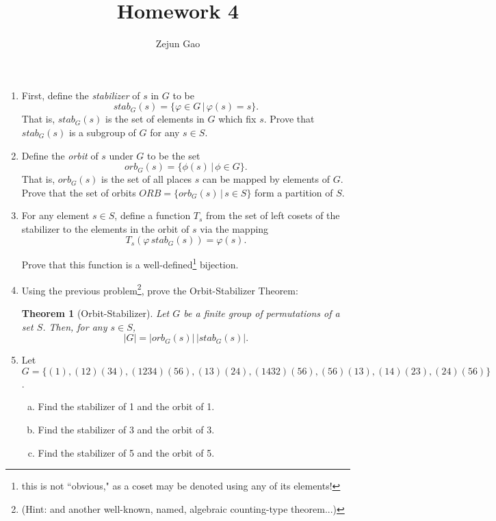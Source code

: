 \documentclass[11pt, one side]{article}
\title{Homework 4}
\author{Zejun Gao}
\newtheorem*{theorem}{Theorem}
\begin{document}
\begin{enumerate}

\item[{\bf Problem 1:}] First, define the {\it stabilizer} of $s$ in $G$ to be $$stab_G(s)=\{\varphi \in G\,|\, \varphi(s) = s\}.$$ That is, $stab_G(s)$ is the set of elements in $G$ which fix $s$. Prove that $stab_G(s)$ is a subgroup of $G$ for any $s\in S$.

\pagebreak

\item[{\bf Problem 2:}] Define the {\it orbit} of $s$ under $G$ to be the set $$orb_G(s) = \{\phi(s)\,|\,\phi\in G\}.$$ That is, $orb_G(s)$ is the set of all places $s$ can be mapped by elements of $G$.  Prove that the set of orbits $ORB = \{orb_G(s)\,|\, s\in S\}$ form a partition of $S$.

\pagebreak

\item[{\bf Problem 3:}] For any element $s\in S$, define a function $T_s$ from the set of left cosets of the stabilizer to the elements in the orbit of $s$ via the mapping $$T_s(\varphi\,stab_G(s)) = \varphi(s).$$

Prove that this function is a well-defined\footnote{this is not ``obvious," as a coset may be denoted using any of its elements!} bijection.

\pagebreak

\item[{\bf Problem 4:}] Using the previous problem\footnote{(Hint: and another well-known, named, algebraic counting-type theorem...)}, prove the Orbit-Stabilizer Theorem: 

\begin{theorem}[Orbit-Stabilizer] Let $G$ be a finite group of permutations of a set $S$. Then, for any $s\in S$, $$|G|=|orb_G(s)|\,|stab_G(s)|.$$
\end{theorem}

\pagebreak

\item[{\bf 7.45}]  Let $G =\{ (1), (12)(34), (1234)(56), (13)(24), (1432)(56), (56)(13), (14)(23), (24)(56)\}$. 
\begin{enumerate}[a)]
\item Find the stabilizer of 1 and the orbit of 1.
\item Find the stabilizer of 3 and the orbit of 3.
\item Find the stabilizer of 5 and the orbit of 5.
\end{enumerate}


\end{enumerate}
\end{document}
